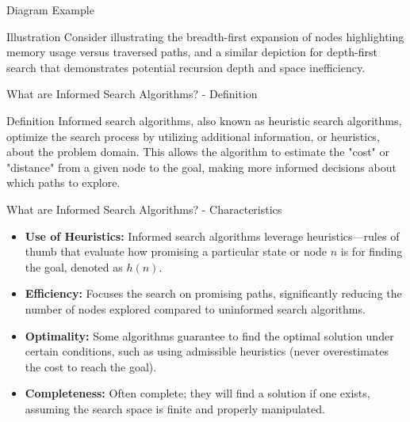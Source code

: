 \documentclass[aspectratio=169]{beamer}
\begin{document}
\begin{frame}[fragile]{Diagram Example}
    \begin{block}{Illustration}
        Consider illustrating the breadth-first expansion of nodes highlighting memory usage versus traversed paths, and a similar depiction for depth-first search that demonstrates potential recursion depth and space inefficiency.
    \end{block}
\end{frame}

\begin{frame}[fragile]{What are Informed Search Algorithms? - Definition}
    \begin{block}{Definition}
        Informed search algorithms, also known as heuristic search algorithms, optimize the search process by utilizing additional information, or heuristics, about the problem domain. This allows the algorithm to estimate the "cost" or "distance" from a given node to the goal, making more informed decisions about which paths to explore.
    \end{block}
\end{frame}

\begin{frame}[fragile]{What are Informed Search Algorithms? - Characteristics}
    \begin{itemize}
        \item \textbf{Use of Heuristics:} Informed search algorithms leverage heuristics—rules of thumb that evaluate how promising a particular state or node \( n \) is for finding the goal, denoted as \( h(n) \).
        
        \item \textbf{Efficiency:} Focuses the search on promising paths, significantly reducing the number of nodes explored compared to uninformed search algorithms.
        
        \item \textbf{Optimality:} Some algorithms guarantee to find the optimal solution under certain conditions, such as using admissible heuristics (never overestimates the cost to reach the goal).
        
        \item \textbf{Completeness:} Often complete; they will find a solution if one exists, assuming the search space is finite and properly manipulated.
    \end{itemize}
\end{frame}
\end{document}
